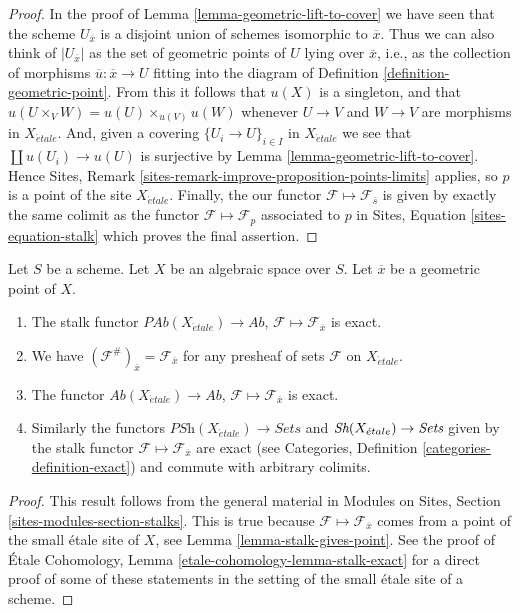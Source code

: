 \begin{proof}
In the proof of
Lemma \ref{lemma-geometric-lift-to-cover}
we have seen that the scheme $U_{\overline{x}}$ is a disjoint union of
schemes isomorphic to $\overline{x}$. Thus we can also think of
$|U_{\overline{x}}|$ as the set of geometric points of $U$ lying over
$\overline{x}$, i.e., as the collection of morphisms
$\overline{u} : \overline{x} \to U$ fitting into the diagram of
Definition \ref{definition-geometric-point}.
From this it follows that $u(X)$ is a singleton, and that
$u(U \times_V W) = u(U) \times_{u(V)} u(W)$
whenever $U \to V$ and $W \to V$ are morphisms in $X_{\acute{e}tale}$.
And, given a covering $\{U_i \to U\}_{i \in I}$ in $X_{\acute{e}tale}$ we see
that $\coprod u(U_i) \to u(U)$ is surjective by
Lemma \ref{lemma-geometric-lift-to-cover}.
Hence
Sites, Remark \ref{sites-remark-improve-proposition-points-limits}
applies, so $p$ is a point of the site $X_{\acute{e}tale}$.
Finally, the our functor $\mathcal{F} \mapsto \mathcal{F}_{\overline{s}}$
is given by exactly the same colimit as the functor
$\mathcal{F} \mapsto \mathcal{F}_p$ associated to $p$ in
Sites, Equation \ref{sites-equation-stalk}
which proves the final assertion.
\end{proof}

\begin{lemma}
\label{lemma-stalk-exact}
Let $S$ be a scheme.
Let $X$ be an algebraic space over $S$.
Let $\overline{x}$ be a geometric point of $X$.
\begin{enumerate}
\item The stalk functor
$\textit{PAb}(X_{\acute{e}tale}) \to \textit{Ab}$,
$\mathcal{F}  \mapsto  \mathcal{F}_{\overline{x}}$
is exact.
\item We have $(\mathcal{F}^\#)_{\overline{x}} = \mathcal{F}_{\overline{x}}$
for any presheaf of sets $\mathcal{F}$ on $X_{\acute{e}tale}$.
\item The functor
$\textit{Ab}(X_{\acute{e}tale}) \to \textit{Ab}$,
$\mathcal{F} \mapsto \mathcal{F}_{\overline{x}}$ is exact.
\item Similarly the functors
$\textit{PSh}(X_{\acute{e}tale}) \to \textit{Sets}$ and
$\mathop{\textit{Sh}}\nolimits(X_{\acute{e}tale}) \to \textit{Sets}$ given by the stalk functor
$\mathcal{F} \mapsto \mathcal{F}_{\overline{x}}$ are exact (see
Categories, Definition \ref{categories-definition-exact})
and commute with arbitrary colimits.
\end{enumerate}
\end{lemma}

\begin{proof}
This result follows from the general material in
Modules on Sites, Section \ref{sites-modules-section-stalks}.
This is true because $\mathcal{F} \mapsto \mathcal{F}_{\overline{x}}$
comes from a point of the small \'etale site of $X$, see
Lemma \ref{lemma-stalk-gives-point}. See the proof of
\'Etale Cohomology, Lemma \ref{etale-cohomology-lemma-stalk-exact}
for a direct proof of some of these statements in the setting of
the small \'etale site of a scheme.
\end{proof}

